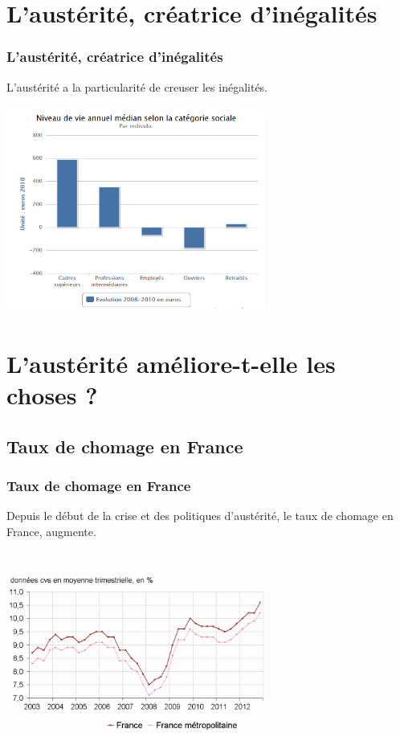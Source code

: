 \documentclass[t]{beamer}
\begin{document}
\section{L'austérité, créatrice d'inégalités}
\begin{frame}
	\frametitle{L'austérité, créatrice d'inégalités}
	L'austérité a la particularité de creuser les inégalités.
	
	\begin{center}
	\includegraphics[width=8.5cm, height=6.8cm]{image/niveau_de_vie.png}
	\end{center}
\end{frame}

\section{L'austérité améliore-t-elle les choses ?}
\subsection{Taux de chomage en France}
\begin{frame}
	\frametitle{Taux de chomage en France}
	Depuis le début de la crise et des politiques d'austérité, le taux de chomage en France, augmente.
	
	\begin{center}
	\includegraphics[width=8.5cm, height=6.8cm]{image/chomage.png}
	\end{center}
\end{frame}
\end{document}
